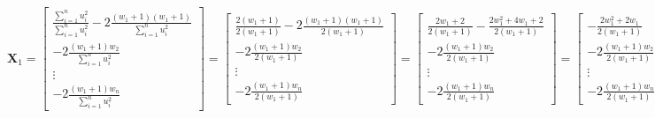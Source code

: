 \documentclass{article}
\begin{document}
\begin{equation*}
    \mathbf{X}_{1} = \begin{bmatrix}
      \frac{\sum_{i=1}^{n}u_{i}^{2}}{\sum_{i=1}^{n}u_{i}^{2}}- 2\frac{\left(w_{1} + 1\right)\left(w_{1} + 1\right)}{\sum_{i=1}^{n}u_{i}^{2}} \\[1mm]
      - 2\frac{\left(w_{1} + 1\right)w_{2}}{\sum_{i=1}^{n}u_{i}^{2}} \\[1mm]
      \vdots \\
      - 2\frac{\left(w_{1} + 1\right)w_{n}}{\sum_{i=1}^{n}u_{i}^{2}}
   \end{bmatrix} = 
  \begin{bmatrix}
    \frac{2\left(w_{1} + 1\right)}{2\left(w_{1} + 1\right)}- 2\frac{\left(w_{1} + 1\right)\left(w_{1} + 1\right)}{2\left(w_{1} + 1\right)} \\[1mm]
      - 2\frac{\left(w_{1} + 1\right)w_{2}}{2\left(w_{1} + 1\right)} \\[1mm]
      \vdots \\
      - 2\frac{\left(w_{1} + 1\right)w_{n}}{2\left(w_{1} + 1\right)}
   \end{bmatrix}
   = 
   \begin{bmatrix}
    \frac{2w_{1} + 2}{2\left(w_{1} + 1\right)}- \frac{2w_{1}^{2} + 4w_{1} + 2}{2\left(w_{1} + 1\right)} \\[1mm]
      - 2\frac{\left(w_{1} + 1\right)w_{2}}{2\left(w_{1} + 1\right)} \\[1mm]
      \vdots \\
      - 2\frac{\left(w_{1} + 1\right)w_{n}}{2\left(w_{1} + 1\right)}
   \end{bmatrix}
   = \begin{bmatrix}
   - \frac{2w_{1}^{2} + 2w_{1}}{2\left(w_{1} + 1\right)} \\[1mm]
      - 2\frac{\left(w_{1} + 1\right)w_{2}}{2\left(w_{1} + 1\right)} \\[1mm]
      \vdots \\
      - 2\frac{\left(w_{1} + 1\right)w_{n}}{2\left(w_{1} + 1\right)}
   \end{bmatrix}
\end{equation*}
\end{document}
